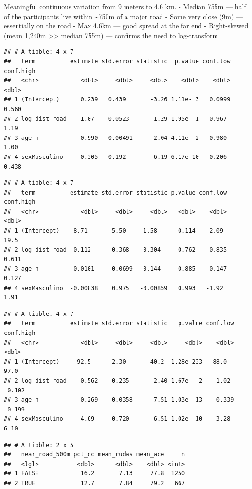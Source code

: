 \documentclass[
  12pt,
]{article}
\begin{document}
Meaningful continuous variation from 9 meters to 4.6 km. - Median 755m
--- half of the participants live within \textasciitilde750m of a major
road - Some very close (9m) --- essentially on the road - Max 4.6km ---
good spread at the far end - Right-skewed (mean 1,240m
\textgreater\textgreater{} median 755m) --- confirms the need to
log-transform

\begin{verbatim}
## # A tibble: 4 x 7
##   term          estimate std.error statistic  p.value conf.low conf.high
##   <chr>            <dbl>     <dbl>     <dbl>    <dbl>    <dbl>     <dbl>
## 1 (Intercept)      0.239   0.439       -3.26 1.11e- 3   0.0999     0.560
## 2 log_dist_road    1.07    0.0523       1.29 1.95e- 1   0.967      1.19 
## 3 age_n            0.990   0.00491     -2.04 4.11e- 2   0.980      1.00 
## 4 sexMasculino     0.305   0.192       -6.19 6.17e-10   0.206      0.438
\end{verbatim}

\begin{verbatim}
## # A tibble: 4 x 7
##   term          estimate std.error statistic p.value conf.low conf.high
##   <chr>            <dbl>     <dbl>     <dbl>   <dbl>    <dbl>     <dbl>
## 1 (Intercept)    8.71       5.50     1.58      0.114   -2.09     19.5  
## 2 log_dist_road -0.112      0.368   -0.304     0.762   -0.835     0.611
## 3 age_n         -0.0101     0.0699  -0.144     0.885   -0.147     0.127
## 4 sexMasculino  -0.00838    0.975   -0.00859   0.993   -1.92      1.91
\end{verbatim}

\begin{verbatim}
## # A tibble: 4 x 7
##   term          estimate std.error statistic   p.value conf.low conf.high
##   <chr>            <dbl>     <dbl>     <dbl>     <dbl>    <dbl>     <dbl>
## 1 (Intercept)     92.5      2.30       40.2  1.28e-233   88.0      97.0  
## 2 log_dist_road   -0.562    0.235      -2.40 1.67e-  2   -1.02     -0.102
## 3 age_n           -0.269    0.0358     -7.51 1.03e- 13   -0.339    -0.199
## 4 sexMasculino     4.69     0.720       6.51 1.02e- 10    3.28      6.10
\end{verbatim}

\begin{verbatim}
## # A tibble: 2 x 5
##   near_road_500m pct_dc mean_rudas mean_ace     n
##   <lgl>           <dbl>      <dbl>    <dbl> <int>
## 1 FALSE            16.2       7.13     77.8  1250
## 2 TRUE             12.7       7.84     79.2   667
\end{verbatim}
\end{document}
